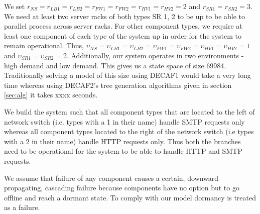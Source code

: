 \documentclass[12pt]{article}
\begin{document}
We set $r_{NS} = r_{LB1} = r_{LB2} = r_{FW1} = r_{FW2} = r_{HV1} = r_{HV2} = 2$ and $r_{SR1} = r_{SR2} = 3$. We need at least two server racks of both types SR 1, 2 to be up to be able to parallel process across server racks. For other component types, we require at least one component of each type of the system up in order for the system to remain operational. Thus, $\upsilon_{NS} = \upsilon_{LB1} = \upsilon_{LB2} = \upsilon_{FW1} = \upsilon_{FW2} = \upsilon_{HV1} = \upsilon_{HV2} = 1$ and $\upsilon_{SR1} = \upsilon_{SR2} = 2$. Additionally, our system operates in two environments - high demand and low demand. This gives us a state space of size 69984. Traditionally solving a model of this size using DECAF1 would take a very long time whereas using DECAF2's tree generation algorithms given in section \ref{sec:alg} it takes xxxx seconds. 

We build the system such that all component types that are located to the left of network switch (i.e. types with a 1 in their name) handle SMTP requests only whereas all component types located to the right of the network switch (i.e types with a 2 in their name) handle HTTP requests only. Thus both the branches need to be operational for the system to be able to handle HTTP and SMTP requests.

We assume that failure of any component causes a certain, downward propagating, cascading failure because components have no option but to go offline and reach a dormant state. To comply with our model dormancy is treated as a failure.        


 
\end{document}
